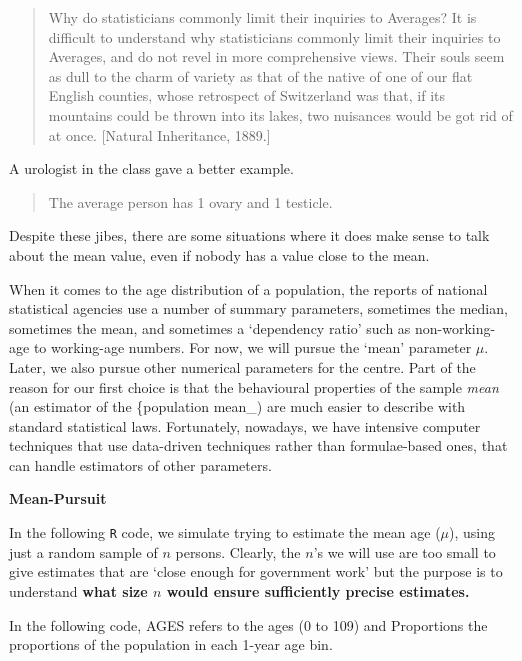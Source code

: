 \documentclass[]{book}
\begin{document}
\begin{quote}
Why do statisticians commonly limit their inquiries to Averages?
It is difficult to understand why statisticians commonly limit their inquiries to Averages, and do not revel in more comprehensive views.
Their souls seem as dull to the charm of variety as that of the native of one of our flat English counties, whose retrospect of Switzerland was that, if its mountains could be thrown into its lakes, two nuisances would be got rid of at once. {[}Natural Inheritance, 1889.{]}
\end{quote}

A urologist in the class gave a better example.

\begin{quote}
The average person has 1 ovary and 1 testicle.
\end{quote}

Despite these jibes, there are some situations where it does make sense to talk about the mean value, even if nobody has a value close to the mean.

When it comes to the age distribution of a population, the reports of national statistical agencies use a number of summary parameters, sometimes the median, sometimes the mean, and sometimes a `dependency ratio' such as non-working-age to working-age numbers. For now, we will pursue the `mean' parameter \(\mu\). Later, we also pursue other numerical parameters for the centre. Part of the reason for our first choice is that the behavioural properties of the sample \emph{mean} (an estimator of the \{population mean\_) are much easier to describe with standard statistical laws. Fortunately, nowadays, we have intensive computer techniques that use data-driven techniques rather than formulae-based ones, that can handle estimators of other parameters.

\textbf{Mean-Pursuit}

In the following \texttt{R} code, we simulate trying to estimate the mean age (\(\mu\)), using just a random sample of \(n\) persons. Clearly, the \(n\)'s we will use are too small to give estimates that are `close enough for government work'
but the purpose is to understand \textbf{what size \(n\) would ensure sufficiently precise estimates.}

In the following code, AGES refers to the ages (0 to 109) and Proportions the proportions of the population in each 1-year age bin.
\end{document}
